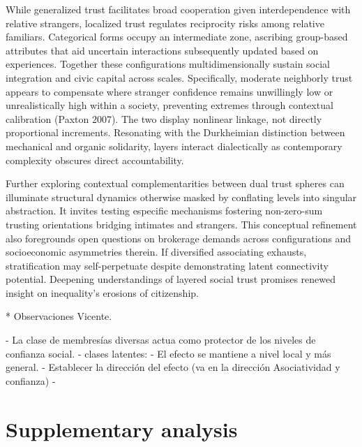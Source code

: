 While generalized trust facilitates broad cooperation given interdependence with relative strangers, localized trust regulates reciprocity risks among relative familiars. Categorical forms occupy an intermediate zone, ascribing group-based attributes that aid uncertain interactions subsequently updated based on experiences. Together these configurations multidimensionally sustain social integration and civic capital across scales. Specifically, moderate neighborly trust appears to compensate where stranger confidence remains unwillingly low or unrealistically high within a society, preventing extremes through contextual calibration (Paxton 2007). The two display nonlinear linkage, not directly proportional increments. Resonating with the Durkheimian distinction between mechanical and organic solidarity, layers interact dialectically as contemporary complexity obscures direct accountability.
\bigskip

Further exploring contextual complementarities between dual trust spheres can illuminate structural dynamics otherwise masked by conflating levels into singular abstraction. It invites testing especific mechanisms fostering non-zero-sum trusting orientations bridging intimates and strangers. This conceptual refinement also foregrounds open questions on brokerage demands across configurations and socioeconomic asymmetries therein. If diversified associating exhausts, stratification may self-perpetuate despite demonstrating latent connectivity potential. Deepening understandings of layered social trust promises renewed insight on inequality’s erosions of citizenship.
\bigskip




* Observaciones Vicente. 

- La clase de membresías diversas actua como protector de los niveles de confianza social. 
- clases latentes: 
- El efecto se mantiene a nivel local y más general. 
- Establecer la dirección del efecto (va en la dirección Asociatividad y confianza) 
- 

\newpage

\printbibliography

\newpage

\section{Supplementary analysis}

